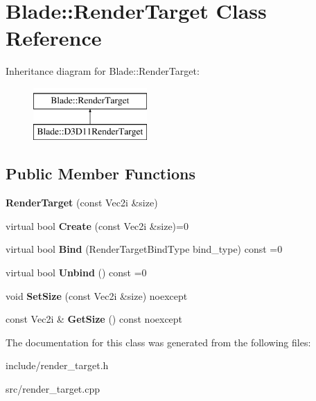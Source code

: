 \hypertarget{class_blade_1_1_render_target}{}\section{Blade\+:\+:Render\+Target Class Reference}
\label{class_blade_1_1_render_target}
Inheritance diagram for Blade\+:\+:Render\+Target\+:\begin{figure}[H]
\begin{center}
\leavevmode
\includegraphics[height=2.000000cm]{class_blade_1_1_render_target}
\end{center}
\end{figure}
\subsection*{Public Member Functions}
\begin{DoxyCompactItemize}
\item 
\mbox{\label{class_blade_1_1_render_target_acd9bdc4a28b22738e0963660f682bda7}} 
{\bfseries Render\+Target} (const Vec2i \&size)
\item 
\mbox{\label{class_blade_1_1_render_target_a62aab69b1a6f7fce87ed6feeeef3ab46}} 
virtual bool {\bfseries Create} (const Vec2i \&size)=0
\item 
\mbox{\label{class_blade_1_1_render_target_a32bdd25885d96b7c7621633190bbb545}} 
virtual bool {\bfseries Bind} (Render\+Target\+Bind\+Type bind\+\_\+type) const =0
\item 
\mbox{\label{class_blade_1_1_render_target_a51e464ab696fbf082b7b4d0281e46117}} 
virtual bool {\bfseries Unbind} () const =0
\item 
\mbox{\label{class_blade_1_1_render_target_af11c64c3d361074ad8c879731b7cf3a8}} 
void {\bfseries Set\+Size} (const Vec2i \&size) noexcept
\item 
\mbox{\label{class_blade_1_1_render_target_aa041c7a923f9bba0f0d77ce349333792}} 
const Vec2i \& {\bfseries Get\+Size} () const noexcept
\end{DoxyCompactItemize}


The documentation for this class was generated from the following files\+:\begin{DoxyCompactItemize}
\item 
include/render\+\_\+target.\+h\item 
src/render\+\_\+target.\+cpp\end{DoxyCompactItemize}
